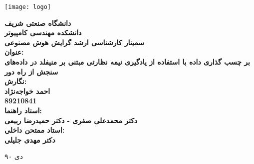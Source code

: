 \thispagestyle{empty}
\begin{center}
\texttt{[image: logo]}
\vskip 1cm
{\bf
دانشگاه صنعتی شریف\\ دانشکده مهندسی کامپیوتر\\ سمینار کارشناسی ارشد گرایش هوش مصنوعی\\
\vskip 1cm
عنوان:\\
بر چسب گذاری داده با استفاده از يادگيری نيمه نظارتی مبتنی بر منيفلد در داده‌های \multispec{} سنجش از راه دور\\
\vskip 1cm
نگارش:\\
احمد خواجه‌نژاد\\
89210841\\
\vskip 1cm
استاد راهنما:\\
دکتر محمدعلی صفری - دکتر حمیدرضا ربیعی\\
\vskip 1cm
استاد ممتحن داخلی:\\
دکتر مهدی جلیلی\\

\vskip 3.5cm

}
دی ۹۰
\newpage
\end{center}


